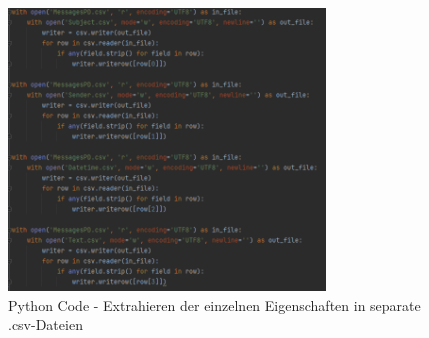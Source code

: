 \begin{figure}
    \centering
    \includegraphics[width=0.75\textwidth]{images/Einzelne_Eigenschaften_in_CSV.PNG}
    \caption{Python Code - Extrahieren der einzelnen Eigenschaften in separate .csv-Dateien} 
    \label{fig:csvseparation}
\end{figure}